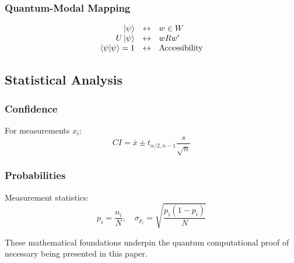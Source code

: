 \subsubsection{Quantum-Modal Mapping}
\begin{equation}
    \begin{array}{rcl}
        \ket{\psi} & \leftrightarrow & w \in W \\
        U\ket{\psi} & \leftrightarrow & wRw' \\
        \braket{\psi|\psi} = 1 & \leftrightarrow & \text{Accessibility}
    \end{array}
\end{equation}

\subsection{Statistical Analysis}

\subsubsection{Confidence}
For measurements $x_i$:
\begin{equation}
    CI = \bar{x} \pm t_{\alpha/2,n-1}\frac{s}{\sqrt{n}}
\end{equation}

\subsubsection{Probabilities}
Measurement statistics:
\begin{equation}
    p_i = \frac{n_i}{N}, \quad \sigma_{p_i} = \sqrt{\frac{p_i(1-p_i)}{N}}
\end{equation}

These mathematical foundations underpin the quantum computational proof of necessary being presented in this paper.